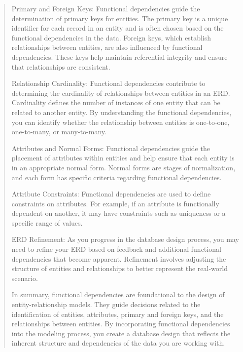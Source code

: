 \documentclass[11pt]{article}
\begin{document}
\begin{enumerate}
\begin{quotation}
    Primary and Foreign Keys:
        Functional dependencies guide the determination of primary keys for entities. The primary key is a unique identifier for each record in an entity and is often chosen based on the functional dependencies in the data.
        Foreign keys, which establish relationships between entities, are also influenced by functional dependencies. These keys help maintain referential integrity and ensure that relationships are consistent.

    Relationship Cardinality:
        Functional dependencies contribute to determining the cardinality of relationships between entities in an ERD. Cardinality defines the number of instances of one entity that can be related to another entity.
        By understanding the functional dependencies, you can identify whether the relationship between entities is one-to-one, one-to-many, or many-to-many.

    Attributes and Normal Forms:
        Functional dependencies guide the placement of attributes within entities and help ensure that each entity is in an appropriate normal form. Normal forms are stages of normalization, and each form has specific criteria regarding functional dependencies.

    Attribute Constraints:
        Functional dependencies are used to define constraints on attributes. For example, if an attribute is functionally dependent on another, it may have constraints such as uniqueness or a specific range of values.

    ERD Refinement:
        As you progress in the database design process, you may need to refine your ERD based on feedback and additional functional dependencies that become apparent. Refinement involves adjusting the structure of entities and relationships to better represent the real-world scenario.

In summary, functional dependencies are foundational to the design of entity-relationship models. They guide decisions related to the identification of entities, attributes, primary and foreign keys, and the relationships between entities. By incorporating functional dependencies into the modeling process, you create a database design that reflects the inherent structure and dependencies of the data you are working with.
\end{quotation}
\end{enumerate}
\end{document}
